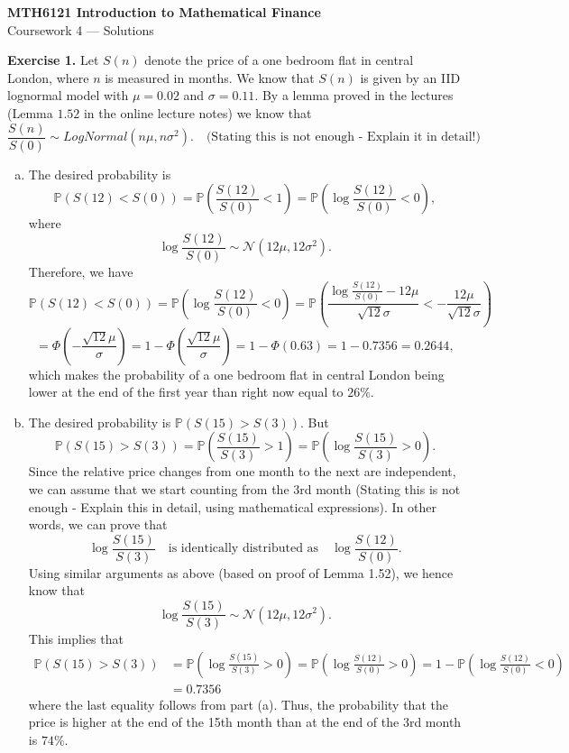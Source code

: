 \documentclass[11pt,a4paper]{report}
\begin{document}
\begin{center}
	\LARGE\textbf{MTH6121 Introduction to Mathematical Finance}\\
	Coursework 4 — Solutions
\end{center}
\textbf{Exercise 1.} Let $S(n)$ denote the price of a one bedroom flat in central London, where $n$ is measured in months. We know that $S(n)$ is given by an IID lognormal model with $\mu = 0.02$ and $\sigma = 0.11$. By a lemma proved in the lectures (Lemma $1.52$ in the online lecture notes) we know that $$\frac{S(n)}{S(0)}\sim LogNormal(n\mu, n\sigma^2).\quad \text{(Stating this is not enough - Explain it in detail!)}$$
\begin{enumerate}[(a)]
    \item The desired probability is $$\mathbb{P}(S(12)<S(0))=\mathbb{P}\left(\frac{S(12)}{S(0)}<1\right) = \mathbb{P}\left(\log \frac{S(12)}{S(0)}<0\right),$$ where $$\log \frac{S(12)}{S(0)}\sim \mathcal{N}(12\mu, 12\sigma^2).$$ Therefore, we have $$\mathbb{P}(S(12)<S(0)) = \mathbb{P}\left(\log \frac{S(12)}{S(0)}<0\right) = \mathbb{P}\left(\frac{\log \frac{S(12)}{S(0)}-12\mu}{\sqrt{12}\sigma}<-\frac{12\mu}{\sqrt{12}\sigma}\right)$$ $$=\Phi\left(-\frac{\sqrt{12}\mu}{\sigma}\right)=1-\Phi\left(\frac{\sqrt{12}\mu}{\sigma}\right)=1-\Phi(0.63)=1-0.7356=0.2644,$$ which makes the probability of a one bedroom flat in central London being lower at the end of the first year than right now equal to $26\%$.
    \item The desired probability is $\mathbb{P}(S(15) > S(3))$. But $$\mathbb{P}(S(15)>S(3))=\mathbb{P}\left(\frac{S(15)}{S(3)}>1\right) = \mathbb{P}\left(\log \frac{S(15)}{S(3)}>0\right).$$ Since the relative price changes from one month to the next are independent, we can assume that we start counting from the 3rd month (Stating this is not enough - Explain this in detail, using mathematical expressions). In other words, we can prove that $$\log \frac{S(15)}{S(3)} \quad \text{is identically distributed as} \quad \log \frac{S(12)}{S(0)}.$$ Using similar arguments as above (based on proof of Lemma 1.52), we hence know that $$\log \frac{S(15)}{S(3)}\sim \mathcal{N} (12\mu,12\sigma^2).$$ This implies that 
    \begin{align*}
        \mathbb{P}(S(15) > S(3)) &= \mathbb{P}\left(\log\frac{S(15)}{S(3)}>0\right)=\mathbb{P}\left(\log \frac{S(12)}{S(0)}>0\right)=1-\mathbb{P}\left(\log \frac{S(12)}{S(0)}<0\right)\\
        &=0.7356
    \end{align*}
    where the last equality follows from part (a). Thus, the probability that the price is higher at the end of the 15th month than at the end of the 3rd month is $74\%$.

\end{enumerate}
\end{document}
